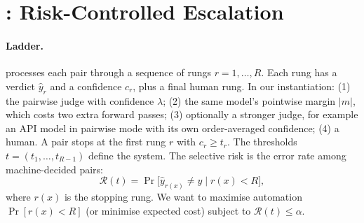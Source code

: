 \section{\eaglev{}: Risk-Controlled Escalation}\label{sec:method}

\paragraph{Ladder.}
\eaglev{} processes each pair through a sequence of rungs $r=1,\dots,R$. Each rung has a verdict $\hat y_r$ and a confidence $c_r$, plus a final human rung.
In our instantiation:
(1) the pairwise judge with confidence $\lambda$;
(2) the same model's pointwise margin $|m|$, which costs two extra forward passes;
(3) optionally a stronger judge, for example an API model in pairwise mode with its own order-averaged confidence;
(4) a human.
A pair stops at the first rung $r$ with $c_r\ge t_r$. The thresholds $t=(t_1,\dots,t_{R-1})$ define the system.
The selective risk is the error rate among machine-decided pairs:
\begin{equation}
  \mathcal R(t)=\Pr\big[\hat y_{r(x)}\neq y \;\big|\; r(x)<R\big],
\end{equation}
where $r(x)$ is the stopping rung. We want to maximise automation $\Pr[r(x)<R]$ (or minimise expected cost) subject to $\mathcal R(t)\le\alpha$.

